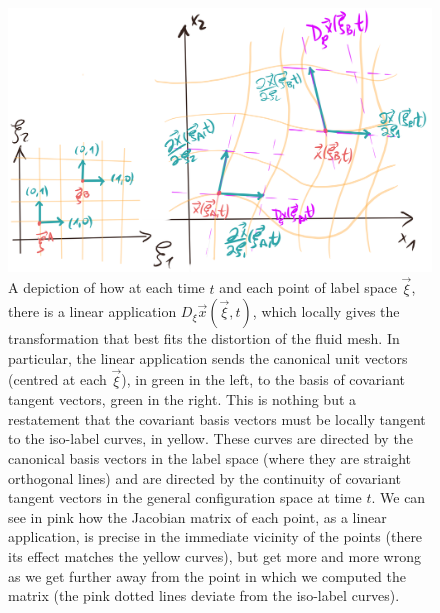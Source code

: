 \documentclass[11pt, a4paper]{article} %
\begin{document}
\begin{figure}[h!]
  \centering
    \includegraphics[width=0.65\linewidth]{4each_locality.png}
  \caption{A depiction of how at each time $t$ and each point of label space $\vec{\xi}$, there is a linear application $D_\xi\vec{x}(\vec{\xi},t)$, which locally gives the transformation that best fits the distortion of the fluid mesh. In particular, the linear application sends the canonical unit vectors (centred at each $\vec{\xi}$), in green in the left, to the basis of covariant tangent vectors, green in the right. This is nothing but a restatement that the covariant basis vectors must be locally tangent to the iso-label curves, in yellow. These curves are directed by the canonical basis vectors in the label space (where they are straight orthogonal lines) and are directed by the continuity of covariant tangent vectors in the general configuration space at time $t$. We can see in pink how the Jacobian matrix of each point, as a linear application, is precise in the immediate vicinity of the points (there its effect matches the yellow curves), but get more and more wrong as we get further away from the point in which we computed the matrix (the pink dotted lines deviate from the iso-label curves). }
  \label{fig:localContinuum}
\end{figure}
\end{document}
